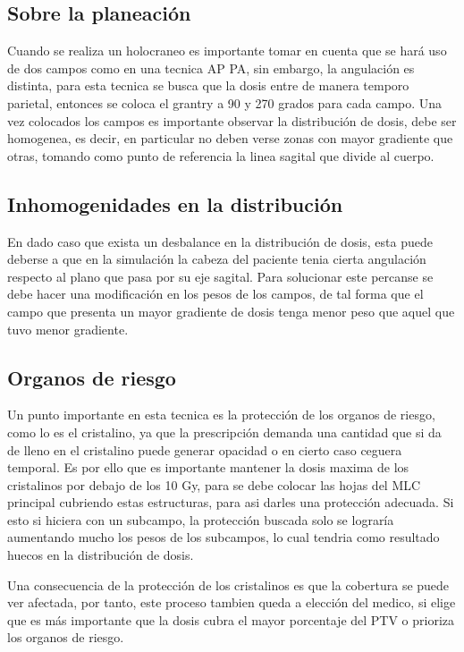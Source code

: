 \documentclass{article}
\begin{document}
\subsection{Sobre la planeación}

Cuando se realiza un holocraneo es importante tomar en cuenta que se hará uso de dos campos como en una tecnica AP PA, sin embargo, la angulación es distinta, para esta tecnica se busca que la dosis entre de manera temporo parietal, entonces se coloca el grantry a 90 y 270 grados para cada campo. Una vez colocados los campos es importante observar la distribución de dosis, debe ser homogenea, es decir, en particular no deben verse zonas con mayor gradiente que otras, tomando como punto de referencia la linea sagital que divide al cuerpo.

\subsection{Inhomogenidades en la distribución}

En dado caso que exista un desbalance en la distribución de dosis, esta puede deberse a que en la simulación la cabeza del paciente tenia cierta angulación respecto al plano que pasa por su eje sagital. Para solucionar este percanse se debe hacer una modificación en los pesos de los campos, de tal forma que el campo que presenta un mayor gradiente de dosis tenga menor peso que aquel que tuvo menor gradiente.

\subsection{Organos de riesgo}

Un punto importante en esta tecnica es la protección de los organos de riesgo, como lo es el cristalino, ya que la prescripción demanda una cantidad que si da de lleno en el cristalino puede generar opacidad o en cierto caso ceguera temporal. Es por ello que es importante mantener la dosis maxima de los cristalinos por debajo de los 10 Gy, para se debe colocar las hojas del MLC principal cubriendo estas estructuras, para asi darles una protección adecuada. Si esto si hiciera con un subcampo, la protección buscada solo se lograría aumentando mucho los pesos de los subcampos, lo cual tendria como resultado huecos en la distribución de dosis.

\vspace{10pt}


Una consecuencia de la protección de los cristalinos es que la cobertura se puede ver afectada, por tanto, este proceso tambien queda a elección del medico, si elige que es más importante que la dosis cubra el mayor porcentaje del PTV o prioriza los organos de riesgo.
\end{document}
